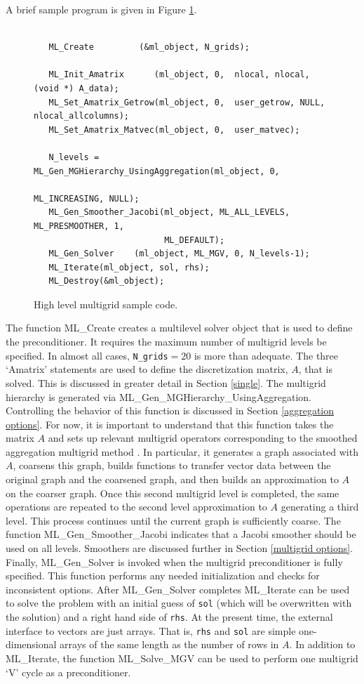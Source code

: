 \documentclass{article}[11pt]
\begin{document}
\medskip

A brief sample program is given in Figure \ref{high level figure}.
%
\begin{figure}[ht]
\begin{verbatim}

   ML_Create         (&ml_object, N_grids);

   ML_Init_Amatrix      (ml_object, 0,  nlocal, nlocal,(void *) A_data);
   ML_Set_Amatrix_Getrow(ml_object, 0,  user_getrow, NULL, nlocal_allcolumns);
   ML_Set_Amatrix_Matvec(ml_object, 0,  user_matvec);

   N_levels = ML_Gen_MGHierarchy_UsingAggregation(ml_object, 0, 
                                                  ML_INCREASING, NULL);
   ML_Gen_Smoother_Jacobi(ml_object, ML_ALL_LEVELS, ML_PRESMOOTHER, 1, 
                          ML_DEFAULT);
   ML_Gen_Solver    (ml_object, ML_MGV, 0, N_levels-1);
   ML_Iterate(ml_object, sol, rhs);
   ML_Destroy(&ml_object);
\end{verbatim}
\caption{High level multigrid sample code. \label{high level figure}}
\end{figure}
%
The function {\sf ML\_Create} creates a multilevel solver object that is
used to define the preconditioner. It requires the
maximum number of multigrid levels be specified. In
almost all cases, {\tt N\_grids}$ = 20$ is more than
adequate. The three `Amatrix' statements are used to define the 
discretization matrix, $A$, that is solved. This is discussed
in greater detail in Section \ref{single}. The 
multigrid hierarchy is generated via
{\sf ML\_Gen\_MGHierarchy\_UsingAggregation}. Controlling the behavior of
this function is discussed in Section \ref{aggregation options}.
For now, it is important
to understand that this function takes the matrix $A$ and sets up
relevant multigrid operators corresponding to the smoothed aggregation
multigrid method \cite{vanek3} \cite{vanek4}. In particular, it generates
a graph associated with $A$, coarsens this graph, builds functions
to transfer vector data between the original graph and
the coarsened graph, and then builds an approximation to $A$ on the
coarser graph. Once this second multigrid level is completed, the same
operations are repeated to the second level 
approximation to $A$ generating a third level. This process continues 
until the 
current graph is sufficiently coarse.  The function {\sf ML\_Gen\_Smoother\_Jacobi}
indicates that a Jacobi smoother should be used on all levels.
Smoothers are discussed further in Section \ref{multigrid options}.
Finally, {\sf ML\_Gen\_Solver} is invoked when the multigrid preconditioner
is fully specified. This function performs any needed initialization and
checks for inconsistent options. After {\sf ML\_Gen\_Solver} completes 
{\sf ML\_Iterate} can be used to solve the 
problem with an initial guess of {\tt sol} (which will be overwritten with
the solution) and a right hand side of {\tt rhs}. At the present time, the
external interface to vectors are just arrays. That is, {\tt rhs} and {\tt sol}
are simple one-dimensional arrays of the same length as the number of rows
in $A$. In addition to {\sf ML\_Iterate}, the function {\sf ML\_Solve\_MGV }
can be used to perform one multigrid `V' cycle as a preconditioner.
\end{document}
